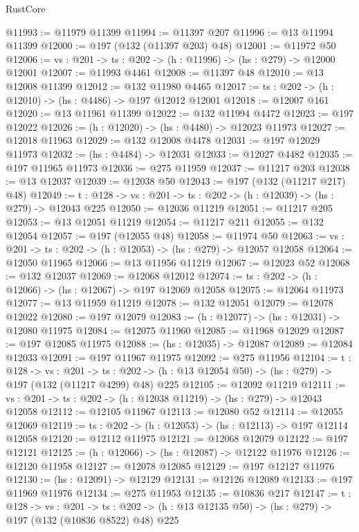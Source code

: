 \begin{lexlean}{RustCore}
\begin{coremodule}
@11993 := @11979 @11399
@11994 := @11397 @207
@11996 := @13 @11994 @11399
@12000 := @197 (@132 (@11397 @203) @48)
@12001 := @11972 @50
@12006 := {vs : @201} -> {ts : @202} -> (h : @11996) -> (hs : @279) -> @12000 @12001
@12007 := @11993 @4461
@12008 := @11397 @48
@12010 := @13 @12008 @11399
@12012 := @132 @11980 @4465
@12017 := {ts : @202} -> (h : @12010) -> (hs : @4486) -> @197 @12012 @12001
@12018 := @12007 @161
@12020 := @13 @11961 @11399
@12022 := @132 @11994 @4472
@12023 := @197 @12022
@12026 := (h : @12020) -> (hs : @4480) -> @12023 @11973
@12027 := @12018 @11963
@12029 := @132 @12008 @4478
@12031 := @197 @12029 @11973
@12032 := (hs : @4484) -> @12031
@12033 := @12027 @4482
@12035 := @197 @11965 @11973
@12036 := @275 @11959
@12037 := @11217 @203
@12038 := @13 @12037
@12039 := @12038 @50
@12043 := @197 (@132 (@11217 @217) @48)
@12049 := {t : @128} -> {vs : @201} -> {ts : @202} -> (h : @12039) -> (hs : @279) -> @12043 @225
@12050 := @12036 @11219
@12051 := @11217 @205
@12053 := @13 @12051 @11219
@12054 := @11217 @211
@12055 := @132 @12054
@12057 := @197 (@12055 @48)
@12058 := @11974 @50
@12063 := {vs : @201} -> {ts : @202} -> (h : @12053) -> (hs : @279) -> @12057 @12058
@12064 := @12050 @11965
@12066 := @13 @11956 @11219
@12067 := @12023 @52
@12068 := @132 @12037
@12069 := @12068 @12012
@12074 := {ts : @202} -> (h : @12066) -> (hs : @12067) -> @197 @12069 @12058
@12075 := @12064 @11973
@12077 := @13 @11959 @11219
@12078 := @132 @12051
@12079 := @12078 @12022
@12080 := @197 @12079
@12083 := (h : @12077) -> (hs : @12031) -> @12080 @11975
@12084 := @12075 @11960
@12085 := @11968 @12029
@12087 := @197 @12085 @11975
@12088 := (hs : @12035) -> @12087
@12089 := @12084 @12033
@12091 := @197 @11967 @11975
@12092 := @275 @11956
@12104 := {t : @128} ->
  {vs : @201} ->
  {ts : @202} -> (h : @13 @12054 @50) -> (hs : @279) -> @197 (@132 (@11217 @4299) @48) @225
@12105 := @12092 @11219
@12111 := {vs : @201} -> {ts : @202} -> (h : @12038 @11219) -> (hs : @279) -> @12043 @12058
@12112 := @12105 @11967
@12113 := @12080 @52
@12114 := @12055 @12069
@12119 := {ts : @202} -> (h : @12053) -> (hs : @12113) -> @197 @12114 @12058
@12120 := @12112 @11975
@12121 := @12068 @12079
@12122 := @197 @12121
@12125 := (h : @12066) -> (hs : @12087) -> @12122 @11976
@12126 := @12120 @11958
@12127 := @12078 @12085
@12129 := @197 @12127 @11976
@12130 := (hs : @12091) -> @12129
@12131 := @12126 @12089
@12133 := @197 @11969 @11976
@12134 := @275 @11953
@12135 := @10836 @217
@12147 := {t : @128} ->
  {vs : @201} ->
  {ts : @202} -> (h : @13 @12135 @50) -> (hs : @279) -> @197 (@132 (@10836 @8522) @48) @225

\end{coremodule}
\end{lexlean}
